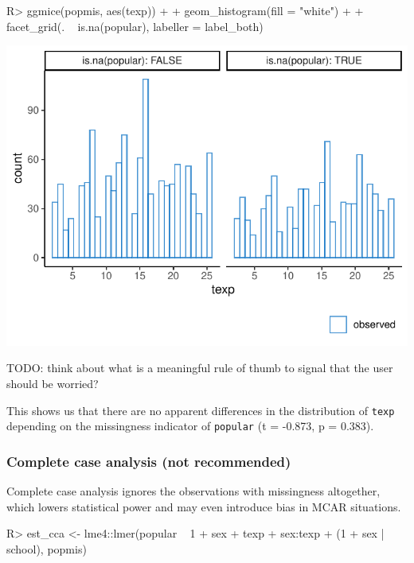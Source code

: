 \documentclass[
]{jss}
\begin{document}
\begin{CodeChunk}
\begin{CodeInput}
R> ggmice(popmis, aes(texp)) +
+   geom_histogram(fill = "white") +
+   facet_grid(. ~ is.na(popular), labeller = label_both)
\end{CodeInput}


\begin{center}\includegraphics{Imputation_of_Incomplete_Multilevel_Data_files/figure-latex/pop-hist-1} \end{center}

\end{CodeChunk}

TODO: think about what is a meaningful rule of thumb to signal that the
user should be worried?

This shows us that there are no apparent differences in the distribution
of \texttt{texp} depending on the missingness indicator of
\texttt{popular} (t = -0.873, p = 0.383).

\hypertarget{complete-case-analysis-not-recommended}{%
\subsubsection{Complete case analysis (not
recommended)}\label{complete-case-analysis-not-recommended}}

Complete case analysis ignores the observations with missingness
altogether, which lowers statistical power and may even introduce bias
in MCAR situations.

\begin{CodeChunk}
\begin{CodeInput}
R> est_cca <- lme4::lmer(popular ~ 1 + sex + texp + sex:texp + (1 + sex | school), popmis) 
\end{CodeInput}
\end{CodeChunk}
\end{document}
